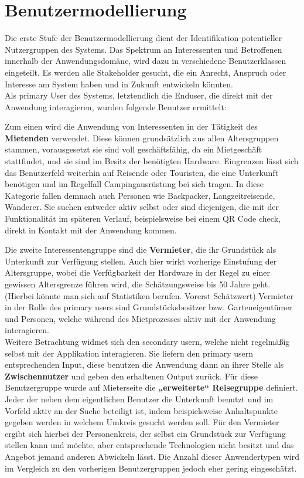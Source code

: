 
\section{Benutzermodellierung}

Die erste Stufe der Benutzermodellierung dient der Identifikation potentieller Nutzergruppen des Systems.
Das Spektrum an Interessenten und Betroffenen innerhalb der Anwendungsdomäne, wird dazu in
verschiedene Benutzerklassen eingeteilt. Es werden alle Stakeholder gesucht, die ein Anrecht, Anspruch oder Interesse am System haben und in Zukunft entwickeln könnten.\\
 
Als primary User des Systems, letztendlich die Enduser, die direkt mit der Anwendung interagieren, wurden folgende Benutzer ermittelt:
 
Zum einen wird die Anwendung von Interessenten in der Tätigkeit des \textbf{Mietenden} verwendet.
Diese können grundsätzlich aus allen Altersgruppen stammen, vorausgesetzt sie sind voll geschäftsfähig, da ein Mietgeschäft stattfindet, und sie sind im Besitz der benötigten Hardware.
Eingrenzen lässt sich das Benutzerfeld weiterhin auf Reisende oder Touristen, die eine Unterkunft benötigen und im Regelfall Campingausrüstung bei sich tragen. In diese Kategorie fallen demnach auch Personen wie Backpacker, Langzeitreisende, Wanderer.
Sie suchen entweder aktiv selbst oder sind diejenigen, die mit der Funktionalität im späteren Verlauf, beispielsweise bei einem QR Code check, direkt in Kontakt mit der Anwendung kommen.
 
Die zweite Interessentengruppe sind die \textbf{Vermieter}, die ihr Grundstück als Unterkunft zur Verfügung stellen. Auch hier wirkt vorherige Einstufung der Altersgruppe, wobei die Verfügbarkeit der Hardware in der Regel zu einer gewissen Altersgrenze führen wird, die Schätzungsweise bis 50 Jahre geht. (Hierbei könnte man sich auf Statistiken berufen. Vorerst Schätzwert)
Vermieter in der Rolle des primary users sind Grundstücksbesitzer bzw. Garteneigentümer und Personen, welche während des Mietprozesses aktiv mit der Anwendung interagieren.\\
 
Weitere Betrachtung widmet sich den secondary usern, welche nicht regelmäßig selbst mit der Applikation interagieren. Sie liefern den primary usern entsprechenden Input, diese benutzen die Anwendung dann an ihrer Stelle als \textbf{Zwischennutzer} und geben den erhaltenen Output zurück. Für diese Benutzergruppe wurde auf Mieterseite die \textbf{„erweiterte“ Reisegruppe} definiert. Jeder der neben dem eigentlichen Benutzer die Unterkunft benutzt und im Vorfeld aktiv an der Suche beteiligt ist, indem beispielsweise Anhaltspunkte gegeben werden in welchem Umkreis gesucht werden soll.
Für den Vermieter ergibt sich hierbei der Personenkreis, der selbst ein Grundstück zur Verfügung stellen kann und möchte, aber entsprechende Technologien nicht besitzt und das Angebot jemand anderen Abwickeln lässt. Die Anzahl dieser Anwendertypen wird im Vergleich zu den vorherigen Benutzergruppen jedoch eher gering eingeschätzt.\\
 
